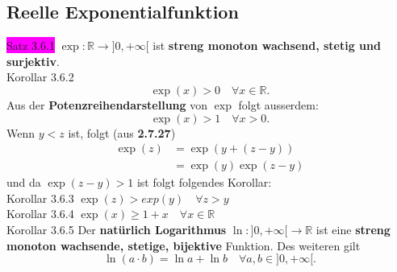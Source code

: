 \documentclass[landscape, 10pt]{article}
\newcommand{\R}{\mathbb{R}}
\begin{document}
\begin{multicols}{3}
       \subsection{Reelle Exponentialfunktion}
              \colorbox{magenta}{Satz 3.6.1} 
                     \textcolor{NavyBlue}{
                     $\exp:\R\longrightarrow]0,+\infty[$}
                     ist \textbf{streng monoton wachsend, stetig und surjektiv}.\\
              \colorbox{BurntOrange}{Korollar 3.6.2} 
                     \begin{equation*}
                            \exp(x)>0\quad\forall x\in\R.
                     \end{equation*}
                     Aus der \textbf{Potenzreihendarstellung} von 
                     \textcolor{NavyBlue}{$\exp$} folgt ausserdem: 
                     \begin{equation*}
                            \exp(x)>1\quad\forall x>0.
                     \end{equation*} 
                     Wenn \textcolor{NavyBlue}{$y<z$} ist, folgt 
                     (aus \textbf{2.7.27})
                     \begin{align*}
                            \exp(z)&=\exp(y+(z-y))\\
                                   &=\exp(y)\exp(z-y)
                     \end{align*}
                     und da \textcolor{NavyBlue}{$\exp(z-y)>1$} 
                     ist folgt folgendes Korollar:\\
              \colorbox{BurntOrange}{Korollar 3.6.3} 
                     \textcolor{NavyBlue}{
                     $\exp(z)>exp(y)\quad\forall z>y$}\\
              \colorbox{BurntOrange}{Korollar 3.6.4} 
                     \textcolor{NavyBlue}{
                     $\exp(x)\geqslant1+x\quad\forall x\in\R$}\\
              \colorbox{BurntOrange}{Korollar 3.6.5} 
                     Der \textbf{natürlich Logarithmus} 
                     $\ln:]0,+\infty[\longrightarrow\R$ ist eine 
                     \textbf{streng monoton 
                     wachsende, stetige, bijektive} 
                     Funktion. Des weiteren gilt 
                     \begin{equation*}
                            \ln(a\cdot b)=\ln a+\ln b\quad
                            \forall a,b\in]0,+\infty[.
                     \end{equation*}

\end{multicols}
\end{document}
